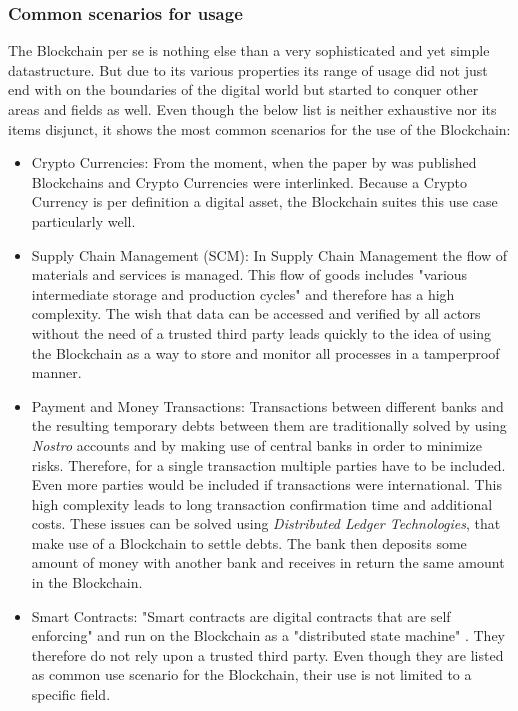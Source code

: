 \subsubsection{Common scenarios for usage}
The Blockchain per se is nothing else than a very sophisticated and yet simple datastructure. But due to its various properties its range of usage did not just end with on the boundaries of the digital world but started to conquer other areas and fields as well. Even though the below list is neither exhaustive nor its items disjunct, it shows the most common scenarios for the use of the Blockchain\cite{Wust2017}:
\begin{itemize}
  \item Crypto Currencies: From the moment, when the paper by \citeauthor{Nakamoto2008} was published Blockchains and Crypto Currencies were interlinked. Because a Crypto Currency is per definition a digital asset, the Blockchain suites this use case particularly well.
  \item Supply Chain Management (SCM): In Supply Chain Management the flow of materials and services is managed. This flow of goods includes "various intermediate storage and production cycles" \cite{Wust2017} and therefore has a high complexity. The wish that data can be accessed and verified  by all actors without the need of a trusted third party leads quickly to the idea of using the Blockchain as a way to store and monitor all processes in a tamperproof manner.
  \item Payment and Money Transactions: Transactions between different banks and the resulting temporary debts between them are traditionally solved by using \textit{Nostro} accounts and by making use of central banks in order to minimize risks. Therefore, for a single transaction multiple parties have to be included. Even more parties would be included if transactions were international. This high complexity leads to long transaction confirmation time and additional costs. These issues can be solved using \textit{Distributed Ledger Technologies}, that make use of a Blockchain to settle debts. The bank then deposits some amount of money with another bank and receives in return the same amount in the Blockchain.
  \item Smart Contracts: "Smart contracts are digital contracts that are self enforcing" and run on the Blockchain as a "distributed state machine" \cite{Wust2017}. They therefore do not rely upon a trusted third party. Even though they are listed as common use scenario for the Blockchain, their use is not limited to a specific field.

\end{itemize}
